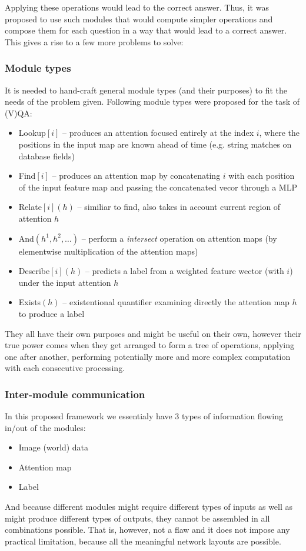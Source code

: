 \documentclass[a4paper,twocolumn]{article}
\begin{document}
Applying these operations would lead to the correct answer. Thus, it was proposed to use such modules that would compute simpler operations and compose them for each question in a way that would lead to a correct answer. This gives a rise to a few more problems to solve:

\subsubsection*{Module types}
It is needed to hand-craft general module types (and their purposes) to fit the needs of the problem given. Following module types were proposed for the task of (V)QA:
    \begin{itemize}
        \item Lookup$[i]$ – produces an attention focused entirely at the index $i$, where the positions in the input map are known ahead of time (e.g. string matches on database fields)
        \item Find$[i]$ – produces an attention map by concatenating $i$ with each position of the input feature map and passing the concatenated vecor through a MLP
        \item Relate$[i](h)$ – similiar to find, also takes in account current region of attention $h$
        \item And$(h^1, h^2, \dots)$ – perform a \textit{intersect} operation on attention maps (by elementwise multiplication of the attention maps)
        \item Describe$[i](h)$ – predicts a label from a weighted feature wector (with $i$) under the input attention $h$
        \item Exists$(h)$ – existentional quantifier examining directly the attention map $h$ to produce a label
    \end{itemize}
They all have their own purposes and might be useful on their own, however their true
power comes when they get arranged to form a tree of operations, applying one after another, performing potentially more and more complex computation with each consecutive processing.

\subsubsection*{Inter-module communication}
In this proposed framework we essentialy have 3 types of information flowing in/out of the modules:
    \begin{itemize}
        \item Image (world) data
        \item Attention map
        \item Label
    \end{itemize}
And because different modules might require different types of inputs as well as might produce different types of outputs, they cannot be assembled in all combinations possible. That is, however, not a flaw and it does not impose any practical limitation, because all the meaningful network layouts are possible.
\end{document}
